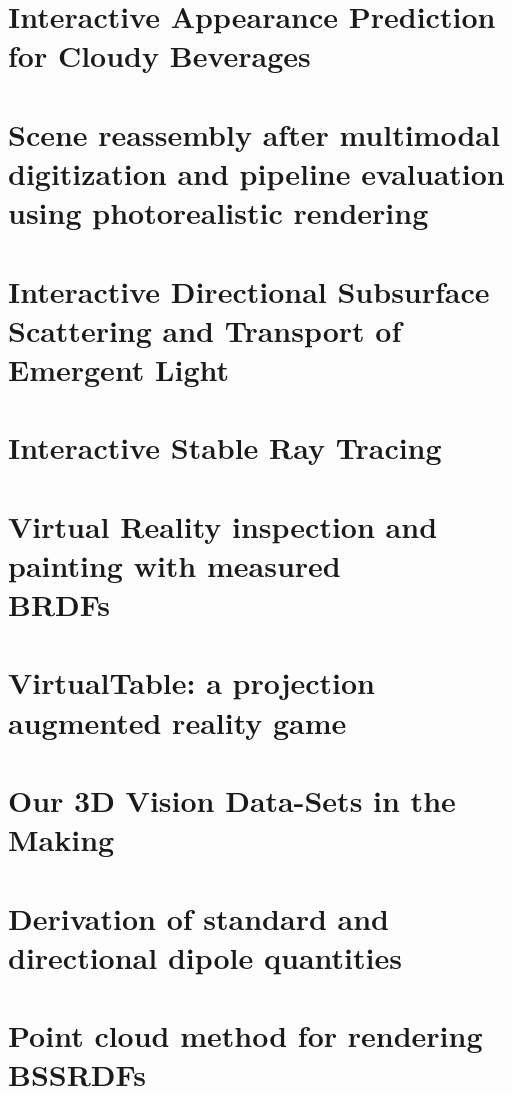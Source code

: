 \chapter{Interactive Appearance Prediction for Cloudy Beverages}
\label{sec:juice}
\label{sec:firstcontribution}

%
\chapter{Scene reassembly after multimodal digitization and pipeline evaluation using photorealistic rendering}
\label{sec:glass}

%
\chapter{Interactive Directional Subsurface Scattering and Transport of Emergent Light}
\label{sec:interactivedirsss}

%
\chapter{Interactive Stable Ray Tracing}
\label{sec:srt}

%
\chapter{Virtual Reality inspection and painting with measured \\BRDFs}
\label{sec:vrbrdf}
\label{sec:lastcontribution}

%
\chapter{VirtualTable: a projection augmented reality game}
\label{sec:virtualtable}

%
\chapter{Our 3D Vision Data-Sets in the Making}
\label{sec:robdataset}

%
\chapter{Derivation of standard and directional dipole quantities}
\label{sec:jensennote}

%
\chapter{Point cloud method for rendering BSSRDFs}
\label{sec:pointcloudnote}

%
